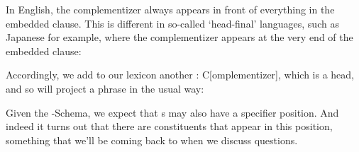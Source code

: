\documentclass{article}
\begin{document}
In English, the complementizer always appears in front of everything in the embedded clause.
This is different in so-called `head-final’ languages, such as Japanese for example, where the complementizer appears at the very end of the embedded clause:%
\begin{exe}
\end{exe}         

Accordingly, we add to our lexicon another : C[omplementizer], which is a head, and so will project a phrase in the usual way:
\begin{exe}
\end{exe}


Given the -Schema, we expect that s may also have a specifier position.
And indeed it turns out that there are constituents that appear in this position, something that we'll be coming back to when we discuss questions.
\printbibliography
\end{document}
